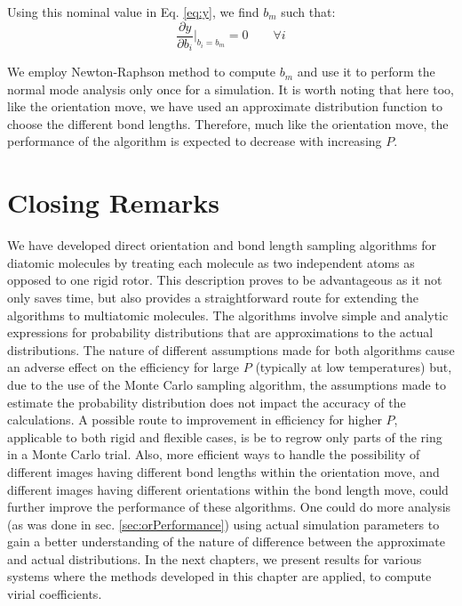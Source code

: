        Using this nominal value in Eq. \eqref{eq:y}, we find $b_m$ such that:
        \begin{equation}
        \label{eq:bm}
            \displaystyle\frac{\partial y}{\partial b_i} \bigg|_{b_i = b_m} = 0 \qquad \forall i
        \end{equation}

        We employ Newton-Raphson method to compute $b_m$ and use it to perform the normal mode analysis only once for a simulation. It is worth noting that here too, like the orientation move, we have used an approximate distribution function to choose the different bond lengths. Therefore, much like the orientation move, the performance of the algorithm is expected to decrease with increasing $P$.

        \section{Closing Remarks}
            We have developed direct orientation and bond length sampling algorithms for diatomic molecules by treating each molecule as two independent atoms as opposed to one rigid rotor. This description proves to be advantageous as it not only saves time, but also provides a straightforward route for extending the algorithms to multiatomic molecules. The algorithms involve simple and analytic expressions for probability distributions that are approximations to the actual distributions. The nature of different assumptions made for both algorithms cause an adverse effect on the efficiency for large $P$ (typically at low temperatures) but, due to the use of the Monte Carlo sampling algorithm, the assumptions made to estimate the probability distribution does not impact the accuracy of the calculations. A possible route to improvement in efficiency for higher $P$, applicable to both rigid and flexible cases, is be to regrow only parts of the ring in a Monte Carlo trial. Also, more efficient ways to handle the possibility of different images having different bond lengths within the orientation move, and different images having different orientations within the bond length move, could further improve the performance of these algorithms. One could do more analysis (as was done in sec. \ref{sec:orPerformance}) using actual simulation parameters to gain a better understanding of the nature of difference between the approximate and actual distributions. In the next chapters, we present results for various systems where the methods developed in this chapter are applied, to compute virial coefficients.
